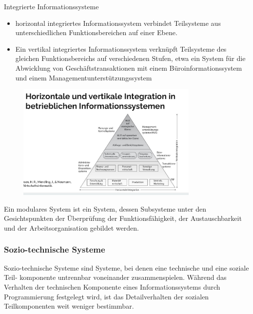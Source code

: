 \clearpage
Integrierte Informationssysteme
\begin{itemize}
  \item horizontal integriertes Informationssystem verbindet Teilsysteme aus unterschiedlichen Funktionsbereichen auf einer Ebene.
  \item Ein vertikal integriertes Informationssystem verknüpft Teilsysteme des gleichen Funktionsbereichs auf verschiedenen Stufen, etwa ein System für die Abwicklung von Geschäftstransaktionen mit einem Büroinformationssystem und einem Managementunterstützungssystem 
\end{itemize}
\begin{figure}[htp]
\begin{center}
  \includegraphics[width=0.8\textwidth]{assets/HoriVertIntegration.PNG}
\end{center}
\end{figure}
\par
Ein modulares System ist ein System, dessen Subsysteme unter den Gesichtspunkten der Überprüfung der Funktionsfähigkeit, der Austauschbarkeit und der Arbeitsorganisation gebildet werden.

\subsubsection{Sozio-technische Systeme}
\par
Sozio-technische Systeme sind Systeme, bei denen eine technische und eine soziale Teil- komponente untrennbar voneinander zusammenspielen. Während das Verhalten der technischen Komponente eines Informationssystems durch Programmierung festgelegt wird, ist das Detailverhalten der sozialen Teilkomponenten weit weniger bestimmbar.

\clearpage
